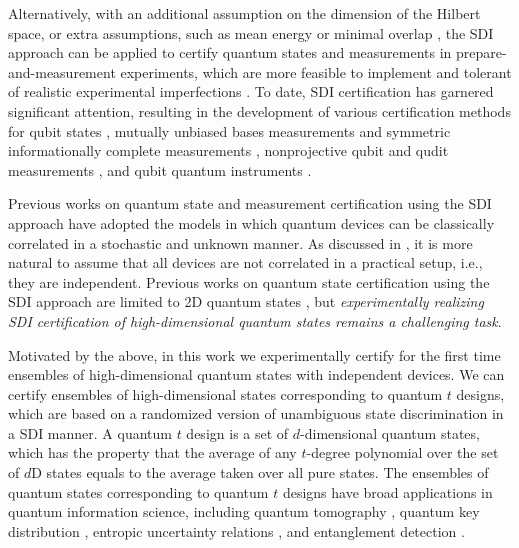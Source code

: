 \documentclass[letterpaper,preprint,superscriptaddress,floatfix,showpacs]{revtex4}
\begin{document}
Alternatively, with an additional assumption on the dimension of the Hilbert space, or extra assumptions, such as mean energy or minimal overlap \cite{Brask2017, Himbeeck2017, Chaves2015}, the SDI approach can be applied to certify quantum states and measurements in prepare-and-measurement experiments, which are more feasible to implement and tolerant of realistic experimental imperfections \cite{Hendrych2012, Ahrens2012, Tavakoli2015, DAmbrosio2014, Lunghi2015, Martinez2018, Sun2020, Biagi2021}. To date, SDI certification has garnered significant attention, resulting in the development of various certification methods for qubit states \cite{Tavakoli2018, li2023,Tavakoli12024}, mutually unbiased bases measurements and symmetric informationally complete measurements \cite{Farkas2019, Tavakoli2019,Gabor2024}, nonprojective qubit and qudit measurements \cite{Tavakoli2020, Mironowicz2019, Fan2022, Martlnez2023}, and qubit quantum instruments \cite{Mohan2019, Miklin2020}.



Previous works on quantum state and measurement certification using the SDI approach have adopted the models in which quantum devices can be classically correlated in a stochastic and unknown manner. As discussed in \cite{Armin2020, Bowles2014}, it is more natural to assume that all devices are not correlated in a practical setup, i.e., they are independent. Previous works on quantum state certification using the SDI approach are limited to 2D quantum states \cite{Tavakoli2018, li2023}, but \textit{experimentally realizing SDI certification of high-dimensional quantum states remains a challenging task}.




Motivated by the above, in this work we experimentally certify for the first time ensembles of high-dimensional quantum states with independent devices. We can certify ensembles of high-dimensional states corresponding to quantum $t$ designs, which are based on a randomized version of unambiguous state discrimination in a SDI manner. A quantum $t$ design \cite{Delsarte1977, Renes2004} is a set of $d$-dimensional quantum states, which has the property that the average of any $t$-degree polynomial over the set of $d$D states equals to the average taken over all pure states. The ensembles of quantum states corresponding to quantum $t$ designs have broad applications in quantum information science, including quantum tomography \cite{Hayashi2005, Scott2008}, quantum key distribution \cite{Renes20042}, entropic uncertainty relations \cite{Ketterer2020}, and entanglement detection \cite{Liu2018,Bae2019}.
\end{document}

